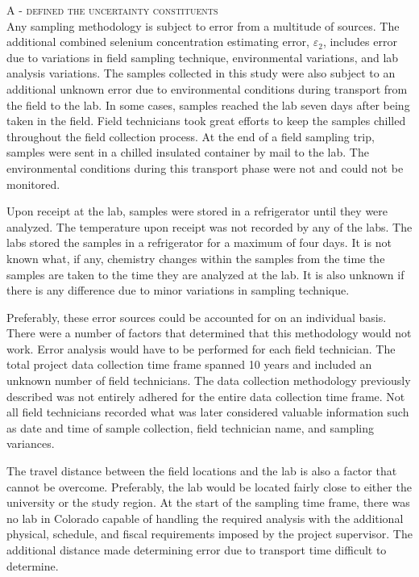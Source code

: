\begin{linenumbers}
\textsc{A - defined the uncertainty constituents}\\
Any sampling methodology is subject to error from a multitude of sources.  The additional combined selenium concentration estimating error, $\varepsilon_{2}$, includes error due to variations in field sampling technique, environmental variations, and lab analysis variations.  The samples collected in this study were also subject to an additional unknown error due to environmental conditions during transport from the field to the lab.  In some cases, samples reached the lab seven days after being taken in the field.  Field technicians took great efforts to keep the samples chilled throughout the field collection process.  At the end of a field sampling trip, samples were sent in a chilled insulated container by mail to the lab.  The environmental conditions during this transport phase were not and could not be monitored.

Upon receipt at the lab, samples were stored in a refrigerator until they were analyzed.  The temperature upon receipt was not recorded by any of the labs.  The labs stored the samples in a refrigerator for a maximum of four days.  It is not known what, if any, chemistry changes within the samples from the time the samples are taken to the time they are analyzed at the lab.  It is also unknown if there is any difference due to minor variations in sampling technique.

Preferably, these error sources could be accounted for on an individual basis.  There were a number of factors that determined that this methodology would not work.  Error analysis would have to be performed for each field technician.  The total project data collection time frame spanned 10 years and included an unknown number of field technicians.  The data collection methodology previously described was not entirely adhered for the entire data collection time frame.  Not all field technicians recorded what was later considered valuable information such as date and time of sample collection, field technician name, and sampling variances.

The travel distance between the field locations and the lab is also a factor that cannot be overcome.  Preferably, the lab would be located fairly close to either the university or the study region.  At the start of the sampling time frame, there was no lab in Colorado capable of handling the required analysis with the additional physical, schedule, and fiscal requirements imposed by the project supervisor.  The additional distance made determining error due to transport time difficult to determine.


\end{linenumbers}
